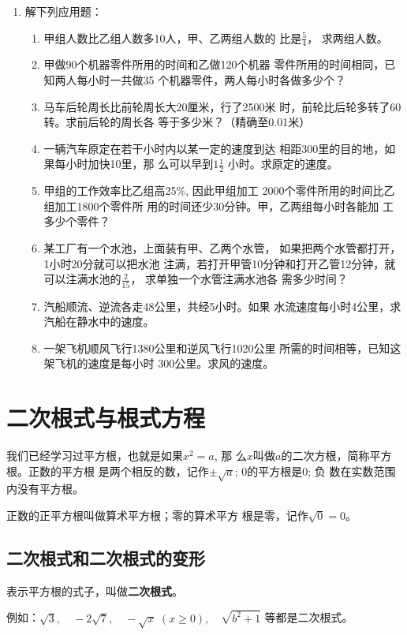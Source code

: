\begin{enumerate}
\item 解下列应用题：
\begin{enumerate}
\item 甲组人数比乙组人数多10人，甲、乙两组人数的
比是$\frac{5}{4}$，
求两组人数。
\item 甲做90个机器零件所用的时间和乙做120个机器
零件所用的时间相同，已知两人每小时一共做35
个机器零件，两人每小时各做多少个？
\item 马车后轮周长比前轮周长大20厘米，行了2500米
时，前轮比后轮多转了60转。求前后轮的周长各
等于多少米？（精确至0.01米）
\item 一辆汽车原定在若干小时内以某一定的速度到达
相距300里的目的地，如果每小时加快10里，那
么可以早到$1\frac{1}{2}$
小时。求原定的速度。
\item 甲组的工作效率比乙组高25\%, 因此甲组加工
2000个零件所用的时间比乙组加工1800个零件所
用的时间还少30分钟。甲，乙两组每小时各能加
工多少个零件？
\item 某工厂有一个水池，上面装有甲、乙两个水管，
如果把两个水管都打开，1小时20分就可以把水池
注满，若打开甲管10分钟和打开乙管12分钟，就
可以注满水池的$\frac{2}{15}$，
求单独一个水管注满水池各
需多少时间？
\item 汽船顺流、逆流各走48公里，共经5小时。如果
水流速度每小时4公里，求汽船在静水中的速度。
\item 一架飞机顺风飞行1380公里和逆风飞行1020公里
所需的时间相等，已知这架飞机的速度是每小时
300公里。求风的速度。
\end{enumerate}
\end{enumerate}

\section{二次根式与根式方程}
我们已经学习过平方根，也就是如果$x^2=a$, 那
么$x$叫做$a$的二次方根，简称平方根。正数的平方根
是两个相反的数，记作$\pm\sqrt{a}$; 0的平方根是0; 负
数在实数范围内没有平方根。

正数的正平方根叫做算术平方根；零的算术平方
根是零，记作$\sqrt{0}=0$。

\subsection{二次根式和二次根式的变形}
表示平方根的式子，叫做\textbf{二次根式}。

例如：$\sqrt{3},\quad -2\sqrt{7},\quad -\sqrt{x}\; (x\ge 0),\quad \sqrt{b^2+1}$
等都是二次根式。


